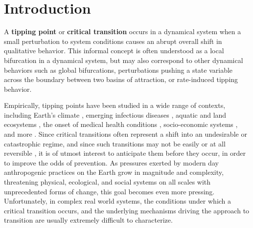
\section{Introduction}
\label{sec:intro}

A \textbf{tipping point} or \textbf{critical transition} occurs in a dynamical system when a small perturbation to system conditions causes an abrupt overall shift in qualitative behavior. This informal concept is often understood as a local bifurcation in a dynamical system, but may also correspond to other dynamical behaviors such as global bifurcations, perturbations pushing a state variable across the boundary between two basins of attraction, or rate-induced tipping behavior. 

Empirically, tipping points have been studied in a wide range of contexts, including 
%
Earth's climate \cite{lentonTippingElementsEarth2008, dakosSlowingEarlyWarning2008a}, 
%
emerging infectious diseases \cite{brettDynamicalFootprintsEnable2020}, 
%
aquatic and land ecosystems \cite{schefferCatastrophicShiftsEcosystems2001a, carpenterRisingVarianceLeading2006}, 
%
the onset of medical health conditions \cite{mcsharryPredictionEpilepticSeizures2003, venegasSelforganizedPatchinessAsthma2005}, 
%
socio-economic systems \cite{ginkelClimateChangeInduced2020}, 
%
and more \cite{georgeEarlyWarningSignals2021, schefferEarlywarningSignalsCritical2009a}. 
%
%
Since critical transitions often represent a shift into an undesirable or catastrophic regime, and since such transitions may not be easily or at all reversible \cite{albrichClimateChangeCauses2020, chenImperfectVaccineHysteresis2019, lucariniThermodynamicAnalysisSnowball2010}, it is of utmost interest to anticipate them before they occur, in order to improve the odds of prevention. 
%
As pressures exerted by modern day anthropogenic practices on the Earth grow in magnitude and complexity, threatening physical, ecological, and social systems on all scales with unprecedented forms of change, this goal becomes even more pressing. 
%
Unfortunately, in complex real world systems, the conditions under which a critical transition occurs, and the underlying mechanisms driving the approach to transition are usually extremely difficult to characterize.

